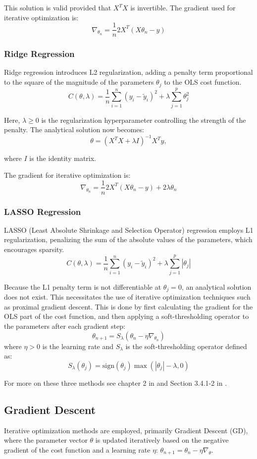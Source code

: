 \documentclass[twocolumn,aps]{revtex4}
\begin{document}
This solution is valid provided that $X^TX$ is invertible. The gradient used for iterative optimization is:
$$\nabla_{\theta_n}=\frac{1}{n}2X^T(X\theta_n-y)$$



\subsubsection{Ridge Regression}
Ridge regression introduces L2 regularization, adding a penalty term proportional to the square of the magnitude of the parameters $\theta_j$ to the OLS cost function.
$$
C(\theta, \lambda) = \frac{1}{n} \sum_{i=1}^{n} (y_i - \tilde{y}_i)^2 + \lambda \sum_{j=1}^{p} \theta_j^2
$$

Here, $\lambda \geq 0$ is the regularization hyperparameter controlling the strength of the penalty. 
The analytical solution now becomes:
$$
\theta=(X^TX+\lambda I)^{-1}X^Ty,
$$

where $I$ is the identity matrix.

The gradient for iterative optimization is:
$$
\nabla_{\theta_n}=\frac{1}{n}2X^T(X\theta_n-y)+2\lambda\theta_n
$$


\subsubsection{LASSO Regression}
LASSO (Least Absolute Shrinkage and Selection Operator) regression employs L1 regularization, penalizing the sum of the absolute values of the parameters, which encourages sparsity.
$$
C(\theta, \lambda)=\frac{1}{n}\sum_{i=1}^{n}(y_i-\tilde{y}_i)^2+\lambda\sum_{j=1}^{p}|\theta_j|
$$

Because the L1 penalty term is not differentiable at $\theta_j=0$, an analytical solution does not exist. 
This necessitates the use of iterative optimization techniques such as proximal gradient descent.
This is done by first calculating the gradient for the OLS part of the cost function, and then applying a soft-thresholding operator to the parameters after each gradient step:
$$\theta_{n+1} = S_{\lambda}(\theta_n - \eta \nabla_{\theta_n})$$
where $\eta > 0$ is the learning rate and $S_{\lambda}$ is the soft-thresholding operator defined as:
$$S_{\lambda}(\theta_j) = \text{sign}(\theta_j) \max(|\theta_j| - \lambda, 0)$$

For more on these three methods see chapter 2 in \cite{compfys} and Section 3.4.1-2 in \cite{hastie}.
\subsection{Gradient Descent}
Iterative optimization methods are employed, primarily Gradient Descent (GD), where the parameter vector $\theta$ is updated iteratively based on the negative gradient of the cost function and a learning rate $\eta$: $\theta_{n+1}=\theta_n-\eta\nabla_{\theta}$.
\end{document}
